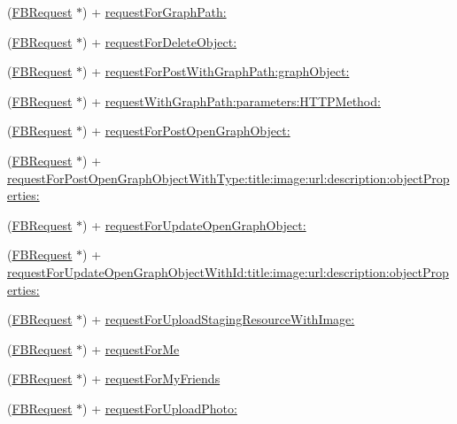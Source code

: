 \begin{DoxyCompactItemize}
\item 
(\hyperlink{interfaceFBRequest}{F\+B\+Request} $\ast$) + \hyperlink{interfaceFBRequest_a33356f35896b2f50d96ed24c8ddf5841}{request\+For\+Graph\+Path\+:}
\item 
(\hyperlink{interfaceFBRequest}{F\+B\+Request} $\ast$) + \hyperlink{interfaceFBRequest_a6d457b796765de6b436e5ff6cf11cc44}{request\+For\+Delete\+Object\+:}
\item 
(\hyperlink{interfaceFBRequest}{F\+B\+Request} $\ast$) + \hyperlink{interfaceFBRequest_ac3f506dd49d0757265f44b41c9579c8b}{request\+For\+Post\+With\+Graph\+Path\+:graph\+Object\+:}
\item 
(\hyperlink{interfaceFBRequest}{F\+B\+Request} $\ast$) + \hyperlink{interfaceFBRequest_a2e3ee15f72f7e3380495fcf1660154ce}{request\+With\+Graph\+Path\+:parameters\+:\+H\+T\+T\+P\+Method\+:}
\item 
(\hyperlink{interfaceFBRequest}{F\+B\+Request} $\ast$) + \hyperlink{interfaceFBRequest_a7eed076cb1c83e3dfe4f29ccfebe68b4}{request\+For\+Post\+Open\+Graph\+Object\+:}
\item 
(\hyperlink{interfaceFBRequest}{F\+B\+Request} $\ast$) + \hyperlink{interfaceFBRequest_aa5c66ef020233f0de4a26473a8b7c87b}{request\+For\+Post\+Open\+Graph\+Object\+With\+Type\+:title\+:image\+:url\+:description\+:object\+Properties\+:}
\item 
(\hyperlink{interfaceFBRequest}{F\+B\+Request} $\ast$) + \hyperlink{interfaceFBRequest_ab92e50866d79923cfb17f1f96f06530b}{request\+For\+Update\+Open\+Graph\+Object\+:}
\item 
(\hyperlink{interfaceFBRequest}{F\+B\+Request} $\ast$) + \hyperlink{interfaceFBRequest_a9accf3aae3b94802e07a0358979bf37d}{request\+For\+Update\+Open\+Graph\+Object\+With\+Id\+:title\+:image\+:url\+:description\+:object\+Properties\+:}
\item 
(\hyperlink{interfaceFBRequest}{F\+B\+Request} $\ast$) + \hyperlink{interfaceFBRequest_a4a85038bef70a9edd91a56ab0db0bfd6}{request\+For\+Upload\+Staging\+Resource\+With\+Image\+:}
\item 
(\hyperlink{interfaceFBRequest}{F\+B\+Request} $\ast$) + \hyperlink{interfaceFBRequest_a1a8fb083c2d09cbbc5ae9afd33e2381f}{request\+For\+Me}
\item 
(\hyperlink{interfaceFBRequest}{F\+B\+Request} $\ast$) + \hyperlink{interfaceFBRequest_a95570ea8628f71b3c311da8378729cc6}{request\+For\+My\+Friends}
\item 
(\hyperlink{interfaceFBRequest}{F\+B\+Request} $\ast$) + \hyperlink{interfaceFBRequest_a871fdb57a3c9907a5d2b788ca442c586}{request\+For\+Upload\+Photo\+:}

\end{DoxyCompactItemize}
